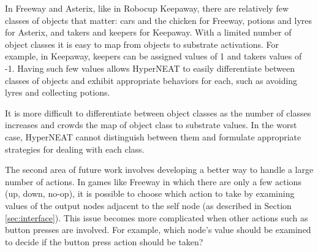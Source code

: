 \documentclass{sig-alternate}
\begin{document}
In Freeway and Asterix, like in Robocup Keepaway, there are relatively few classes of objects that matter: cars and the chicken for Freeway, potions and lyres for Asterix, and takers and keepers for Keepaway. With a limited number of object classes it is easy to map from objects to substrate activations. For example, in Keepaway, keepers can be assigned values of 1 and takers values of -1. Having such few values allows HyperNEAT to easily differentiate between classes of objects and exhibit appropriate behaviors for each, such as avoiding lyres and collecting potions.

It is more difficult to differentiate between object classes as the number of classes increases and crowds the map of object class to substrate values. In the worst case, HyperNEAT cannot distinguish between them and formulate appropriate strategies for dealing with each class.


The second area of future work involves developing a better way to handle a large number of actions. In games like Freeway in which there are only a few actions (up, down, no-op), it is possible to choose which action to take by examining values of the output nodes adjacent to the self node (as described in Section \ref{sec:interface}). This issue becomes more complicated when other actions such as button presses are involved. For example, which node's value should be examined to decide if the button press action should be taken? 

\end{document}
